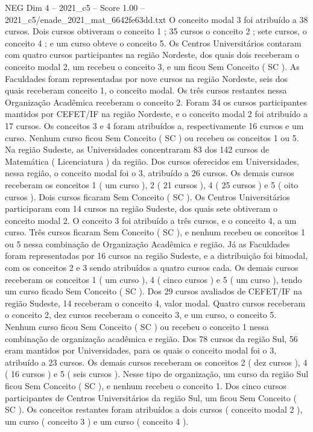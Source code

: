 \begin{textsample}{NEG Dim 4 – 2021\_c5 – Score 1.00 – 2021\_c5/enade\_2021\_mat\_6642fe63dd.txt}
O conceito modal 3 foi atribuído a 38 cursos.
Dois cursos obtiveram o conceito 1 ; 35 cursos o conceito 2 ; sete cursos, o conceito 4 ; e um curso obteve o conceito 5.
Os Centros Universitários contaram com quatro cursos participantes na região Nordeste, dos quais dois receberam o conceito modal 2, um recebeu o conceito 3, e um ficou Sem Conceito ( SC ).
As Faculdades foram representadas por nove cursos na região Nordeste, seis dos quais receberam conceito 1, o conceito modal.
Os três cursos restantes nessa Organização Acadêmica receberam o conceito 2.
Foram 34 os cursos participantes mantidos por CEFET/IF na região Nordeste, e o conceito modal 2 foi atribuído a 17 cursos.
Os conceitos 3 e 4 foram atribuídos a, respectivamente 16 cursos e um curso.
Nenhum curso ficou Sem Conceito ( SC ) ou recebeu os conceitos 1 ou 5.
Na região Sudeste, as Universidades concentraram 83 dos 142 cursos de Matemática ( Licenciatura ) da região.
Dos cursos oferecidos em Universidades, nessa região, o conceito modal foi o 3, atribuído a 26 cursos.
Os demais cursos receberam os conceitos 1 ( um curso ), 2 ( 21 cursos ), 4 ( 25 cursos ) e 5 ( oito cursos ).
Dois cursos ficaram Sem Conceito ( SC ).
Os Centros Universitários participaram com 14 cursos na região Sudeste, dos quais sete obtiveram o conceito modal 2.
O conceito 3 foi atribuído a três cursos, e o conceito 4, a um curso.
Três cursos ficaram Sem Conceito ( SC ), e nenhum recebeu os conceitos 1 ou 5 nessa combinação de Organização Acadêmica e região.
Já as Faculdades foram representadas por 16 cursos na região Sudeste, e a distribuição foi bimodal, com os conceitos 2 e 3 sendo atribuídos a quatro cursos cada.
Os demais cursos receberam os conceitos 1 ( um curso ), 4 ( cinco cursos ) e 5 ( um curso ), tendo um curso ficado Sem Conceito ( SC ).
Dos 29 cursos avaliados de CEFET/IF na região Sudeste, 14 receberam o conceito 4, valor modal.
Quatro cursos receberam o conceito 2, dez cursos receberam o conceito 3, e um curso, o conceito 5.
Nenhum curso ficou Sem Conceito ( SC ) ou recebeu o conceito 1 nessa combinação de organização acadêmica e região.
Dos 78 cursos da região Sul, 56 eram mantidos por Universidades, para os quais o conceito modal foi o 3, atribuído a 23 cursos.
Os demais cursos receberam os conceitos 2 ( dez cursos ), 4 ( 16 cursos ) e 5 ( seis cursos ).
Nesse tipo de organização, um curso da região Sul ficou Sem Conceito ( SC ), e nenhum recebeu o conceito 1.
Dos cinco cursos participantes de Centros Universitários da região Sul, um ficou Sem Conceito ( SC ).
Os conceitos restantes foram atribuídos a dois cursos ( conceito modal 2 ), um curso ( conceito 3 ) e um curso ( conceito 4 ).

\end{textsample}
